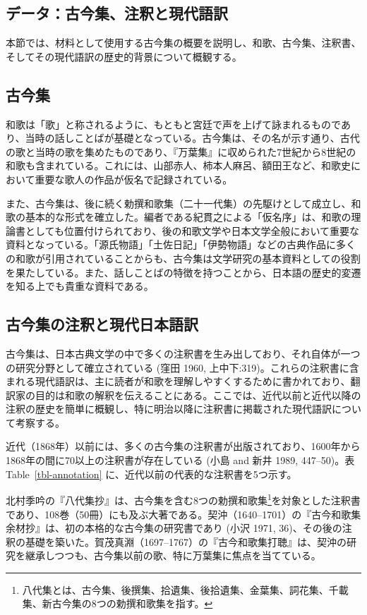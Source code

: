 \documentclass[
  letterpaper,
  DIV=11,
  numbers=noendperiod]{scrartcl}
\begin{document}
\subsection{データ：古今集、注釈と現代語訳}\label{sec-materials}

本節では、材料として使用する古今集の概要を説明し、和歌、古今集、注釈書、そしてその現代語訳の歴史的背景について概観する。

\subsection{古今集}\label{ux53e4ux4ecaux96c6}

和歌は「歌」と称されるように、もともと宮廷で声を上げて詠まれるものであり、当時の話しことばが基礎となっている。古今集は、その名が示す通り、古代の歌と当時の歌を集めたものであり、『万葉集』に収められた7世紀から8世紀の和歌も含まれている。これには、山部赤人、柿本人麻呂、額田王など、和歌史において重要な歌人の作品が仮名で記録されている。

また、古今集は、後に続く勅撰和歌集（二十一代集）の先駆けとして成立し、和歌の基本的な形式を確立した。編者である紀貫之による「仮名序」は、和歌の理論書としても位置付けられており、後の和歌文学や日本文学全般において重要な資料となっている。「源氏物語」「土佐日記」「伊勢物語」などの古典作品に多くの和歌が引用されていることからも、古今集は文学研究の基本資料としての役割を果たしている。また、話しことばの特徴を持つことから、日本語の歴史的変遷を知る上でも貴重な資料である。

\subsection{古今集の注釈と現代日本語訳}\label{ux53e4ux4ecaux96c6ux306eux6ce8ux91c8ux3068ux73feux4ee3ux65e5ux672cux8a9eux8a33}

古今集は、日本古典文学の中で多くの注釈書を生み出しており、それ自体が一つの研究分野として確立されている
(窪田 1960,
上中下:319)。これらの注釈書に含まれる現代語訳は、主に読者が和歌を理解しやすくするために書かれており、翻訳家の目的は和歌の解釈を伝えることにある。ここでは、近代以前と近代以降の注釈の歴史を簡単に概観し、特に明治以降に注釈書に掲載された現代語訳について考察する。

近代（1868年）以前には、多くの古今集の注釈書が出版されており、1600年から1868年の間に70以上の注釈書が存在している
(小島 and 新井 1989, 447--50)。表 Table~\ref{tbl-annotation}
に、近代以前の代表的な注釈書を5つ示す。

北村季吟の『八代集抄』は、古今集を含む8つの勅撰和歌集\footnote{八代集とは、古今集、後撰集、拾遺集、後拾遺集、金葉集、詞花集、千載集、新古今集の8つの勅撰和歌集を指す。}を対象とした注釈書であり、108巻（50冊）にも及ぶ大著である。契沖（1640--1701）の『古今和歌集余材抄』は、初の本格的な古今集の研究書であり
(小沢 1971,
36)、その後の注釈の基礎を築いた。賀茂真淵（1697--1767）の『古今和歌集打聴』は、契沖の研究を継承しつつも、古今集以前の歌、特に万葉集に焦点を当てている。
\end{document}
